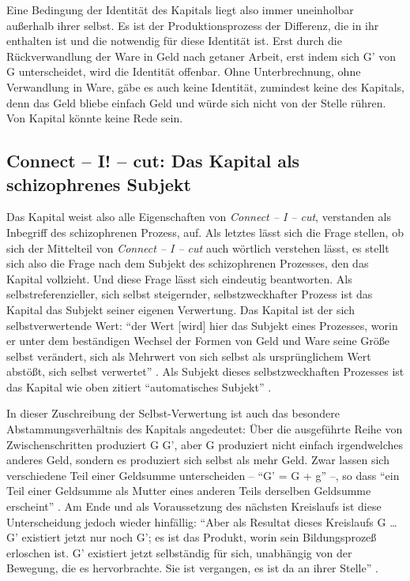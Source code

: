 \documentclass[12pt,
               paper=a4,
               twoside=false,
               onehalfspacing,
               bibliography=totoc,
               toc=graduated,
               ]{scrartcl}
\newcommand{\pc}[2]{\parencite[#1]{#2}}
\newcommand{\cic}{Connect -- I -- cut\xspace}
\begin{document}

Eine Bedingung der Identität des Kapitals liegt also immer uneinholbar
außerhalb ihrer selbst. Es ist der Produktionsprozess der Differenz,
die in ihr enthalten ist und die notwendig für diese Identität ist.
Erst durch die Rückverwandlung der Ware in Geld nach \glq getaner
Arbeit\grq, erst indem sich G' von G unterscheidet, wird die Identität
offenbar. Ohne Unterbrechnung, ohne Verwandlung in Ware, gäbe es auch
keine Identität, zumindest keine des Kapitals, denn das Geld bliebe
einfach Geld und würde sich nicht von der Stelle rühren. Von Kapital
könnte keine Rede sein.




\subsection{Connect -- I! -- cut: Das Kapital als schizophrenes Subjekt}

Das Kapital weist also alle Eigenschaften von \emph{\cic}, verstanden
als Inbegriff des schizophrenen Prozess, auf. Als letztes lässt sich
die Frage stellen, ob sich der Mittelteil von \emph{\cic} auch
wörtlich verstehen lässt, es stellt sich also die Frage nach dem
Subjekt des schizophrenen Prozesses, den das Kapital vollzieht. Und
diese Frage lässt sich eindeutig beantworten. Als
selbstreferenzieller, sich selbst steigernder, selbstzweckhafter
Prozess ist das Kapital das Subjekt seiner eigenen Verwertung. Das
Kapital ist der sich selbstverwertende Wert: "`der Wert [wird] hier
das Subjekt eines Prozesses, worin er unter dem beständigen Wechsel
der Formen von Geld und Ware seine Größe selbst verändert, sich als
Mehrwert von sich selbst als ursprünglichem Wert abstößt, sich selbst
verwertet"' \pc{169}{kap}. Als Subjekt dieses selbstzweckhaften
Prozesses ist das Kapital wie oben zitiert "`automatisches Subjekt"'
\pc{169}{kap}.

In dieser Zuschreibung der Selbst-Verwertung ist auch das besondere
\glq Abstammungsverhältnis\grq{} des Kapitals angedeutet: Über die
ausgeführte Reihe von Zwischenschritten \glq produziert\grq{} G G',
aber G \glq produziert\grq{} nicht einfach irgendwelches anderes Geld,
sondern es produziert sich selbst als mehr Geld. Zwar lassen sich
verschiedene Teil einer Geldsumme unterscheiden -- "`G' = G + g"'
\pc{51}{kap2} --, so dass "`ein Teil einer Geldsumme als Mutter eines
anderen Teils derselben Geldsumme erscheint"' \pc{55}{kap2}. Am Ende
und als Voraussetzung des nächsten Kreislaufs ist diese Unterscheidung
jedoch wieder hinfällig: "`Aber als Resultat dieses Kreislaufs G \dots
G' existiert jetzt nur noch G'; es ist das Produkt, worin sein
Bildungsprozeß erloschen ist. G' existiert jetzt selbständig für sich,
unabhängig von der Bewegung, die es hervorbrachte. Sie ist vergangen,
es ist da an ihrer Stelle"' \pc{49}{kap2}.
\end{document}
